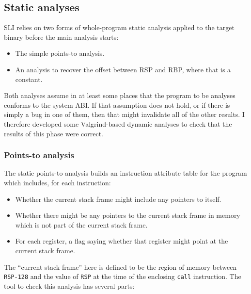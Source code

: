 \subsection{Static analyses}

SLI relies on two forms of whole-program static analysis applied to the target binary before the main analysis starts:

\begin{itemize}
\item
  The simple points-to analysis.
\item
  An analysis to recover the offset between RSP and RBP, where that is a constant.
\end{itemize}

Both analyses assume in at least some places that the program to be analyses conforms to the system ABI.
If that assumption does not hold, or if there is simply a bug in one of them, then that might invalidate all of the other results.
I therefore developed some Valgrind-based dynamic analyses to check that the results of this phase were correct.


\subsubsection{Points-to analysis}
\label{sect:eval:validate:pta}

The static points-to analysis builds an instruction attribute table
for the program which includes, for each instruction:

\begin{itemize}
\item
  Whether the current stack frame might include any pointers to itself.
\item
  Whether there might be any pointers to the current stack frame in memory which is not part of the current stack frame.
\item
  For each register, a flag saying whether that register might point at the current stack frame.
\end{itemize}

The ``current stack frame'' here is defined to be the region of memory between \verb|RSP-128| and the value of \verb|RSP| at the time of the enclosing \verb|call| instruction.
The tool to check this analysis has several parts:

